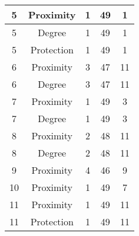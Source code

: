 \documentclass[results.tex]{subfiles}
\begin{document}
\begin{center}
\begin{tabular}{| c || c | c | c | c |}
            \hline
            5                       & Proximity                    & 1                      & 49                      & 1                    \\
            \hline
            5                       & Degree                       & 1                      & 49                      & 1                    \\
            \hline
            5                       & Protection                   & 1                      & 49                      & 1                    \\
            \hline
            6                       & Proximity                    & 3                      & 47                      & 11                   \\
            \hline
            6                       & Degree                       & 3                      & 47                      & 11                   \\
            \hline
            7                       & Proximity                    & 1                      & 49                      & 3                    \\
            \hline
            7                       & Degree                       & 1                      & 49                      & 3                    \\
            \hline
            8                       & Proximity                    & 2                      & 48                      & 11                   \\
            \hline
            8                       & Degree                       & 2                      & 48                      & 11                   \\
            \hline
            9                       & Proximity                    & 4                      & 46                      & 9                    \\
            \hline
            10                      & Proximity                    & 1                      & 49                      & 7                    \\
            \hline
            11                      & Proximity                    & 1                      & 49                      & 11                   \\
            \hline
            11                      & Protection                   & 1                      & 49                      & 11                   \\

\end{tabular}
\end{center}
\end{document}
